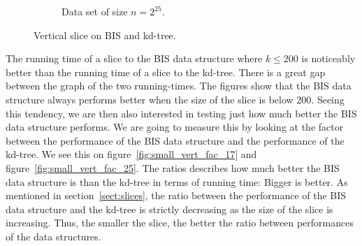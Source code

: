 \begin{figure}[h]
{\begin{subfigure}[b]{0.68\textwidth}
        \caption{Data set of size $n=2^{25}$.}
        \label{fig:small_vert_25}
    \end{subfigure}
  }
    \caption{Vertical slice on BIS and kd-tree.}
    \label{fig:small_vert_17_25}
  
\end{figure}

The running time of a slice to the BIS data structure where $k \leq 200$ is noticeably better than the running time of a slice to the kd-tree. There is a great gap between the graph of the two running-times. The figures show that the BIS data structure always performs better when the size of the slice is below $200$. Seeing this tendency, we are then also interested in testing just how much better the BIS data structure performs. We are going to measure this by looking at the factor between the performance of the BIS data structure and the performance of the kd-tree. We see this on figure~\ref{fig:small_vert_fac_17} and figure~\ref{fig:small_vert_fac_25}. The ratios describes how much better the BIS data structure is than the kd-tree in terms of running time: Bigger is better. As mentioned in section~\ref{sect:slices}, the ratio between the performance of the BIS data structure and the kd-tree is strictly decreasing as the size of the slice is increasing. Thus, the smaller the slice, the better the ratio between performances of the data structures. 



